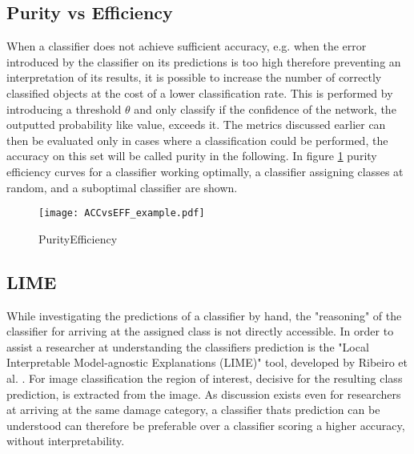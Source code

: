 \subsection{Purity vs Efficiency}
When a classifier does not achieve sufficient accuracy, e.g. when the error introduced by the classifier on its predictions is too high therefore preventing an interpretation of its results, it is possible to increase the number of correctly classified objects at the cost of a lower classification rate. This is performed by introducing a threshold $\theta$ and only classify if the confidence of the network, the outputted probability like value, exceeds it. The metrics discussed earlier can then be evaluated only in cases where a classification could be performed, the accuracy on this set will be called purity in the following. In figure \ref{fig:PURvsEFF} purity efficiency curves for a classifier working optimally, a classifier assigning classes at random, and a suboptimal classifier are shown. 

\begin{figure}[H]
\begin{center}
\texttt{[image: ACCvsEFF\_example.pdf]}

\end{center}
\caption{PurityEfficiency}
\label{fig:PURvsEFF}
\end{figure}

\subsection{LIME}
While investigating the predictions of a classifier by hand, the "reasoning" of the classifier for arriving at the assigned class is not directly accessible. In order to assist a researcher at understanding the classifiers prediction is the "Local Interpretable Model-agnostic Explanations (LIME)" tool, developed by Ribeiro et al. \cite{Ribeiro2016}. For image classification the region of interest, decisive for the resulting class prediction, is extracted from the image. As discussion exists even for researchers at arriving at the same damage category, a classifier thats prediction can be understood can therefore be preferable over a classifier scoring a higher accuracy, without interpretability. 





